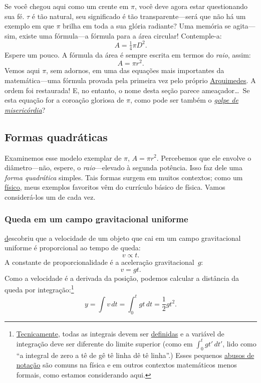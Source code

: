 {Se você chegou aqui como um crente em $\pi$, você deve agora estar questionando sua fé. $\tau$ é tão natural, seu significado é tão transparente---será que não há um exemplo em que $\pi$ brilha em toda a sua glória radiante? Uma memória se agita---sim, existe uma fórmula---a fórmula para a área circular! Contemple-a:
\[ A = \tfrac{1}{4} \pi D^2. \]
Espere um pouco. A fórmula da área é sempre escrita em termos do \emph{raio}, assim:
\[ A = \pi r^2. \]
Vemos aqui $\pi$, sem adornos, em uma das equações mais importantes da matemática---uma fórmula provada pela primeira vez pelo próprio \href{https://pt.wikipedia.org/wiki/Arquimedes}{Arquimedes}. A ordem foi restaurada! E, no entanto, o nome desta seção parece ameaçador\ldots\ Se esta equação for a coroação gloriosa de $\pi$, como pode ser também o \href{https://pt.wikipedia.org/wiki/Golpe_de_miseric%C3%B3rdia}{\emph{golpe de misericórdia}}?

  \subsection{Formas quadráticas} %
  \label{sec:quadratic_forms}

Examinemos esse modelo exemplar de $\pi$, $A = \pi r^2$. Percebemos que ele envolve o diâmetro---não, espere, o \emph{raio}---elevado à segunda potência. Isso faz dele uma \emph{forma quadrática} simples. Tais formas surgem em muitos contextos; como um \href{https://thesis.library.caltech.edu/1940/}{físico}, meus exemplos favoritos vêm do currículo básico de física. Vamos considerá-los um de cada vez.

    \subsubsection{Queda em um campo gravitacional uniforme} %
    \label{sec:falling_in_a_uniform_gravitational_field}

\href{https://pt.wikipedia.org/wiki/Galileu_Galilei} descobriu que a velocidade de um objeto que cai em um campo gravitacional uniforme é proporcional ao tempo de queda:
\[ v \propto t. \]
A constante de proporcionalidade é a aceleração gravitacional~$g$:
\[ v = g t. \]
Como a velocidade é a derivada da posição, podemos calcular a distância da queda por integração:\footnote{\href{https://xkcd.com/1475/}{Tecnicamente}, todas as integrais devem ser \href{https://mathworld.wolfram.com/DefiniteIntegral.html}{definidas} e a variável de integração deve ser diferente do limite superior (como em $\int_0^t gt'\,dt'$, lido como ``a integral de zero a tê de gê tê linha dê tê linha''.) Esses pequenos \href{https://en.wikipedia.org/wiki/Abuse_of_notation}{abusos de notação} são comuns na física e em outros contextos matemáticos menos formais, como estamos considerando aqui.}
\[ y = \int v\,dt = \int_0^t gt\,dt = \textstyle{\frac{1}{2}} gt^2. \]


}
